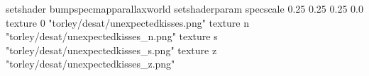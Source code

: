 setshader bumpspecmapparallaxworld
setshaderparam specscale 0.25 0.25 0.25 0.0
texture 0 "torley/desat/unexpectedkisses.png"
texture n "torley/desat/unexpectedkisses_n.png"
texture s "torley/desat/unexpectedkisses_s.png"
texture z "torley/desat/unexpectedkisses_z.png"

